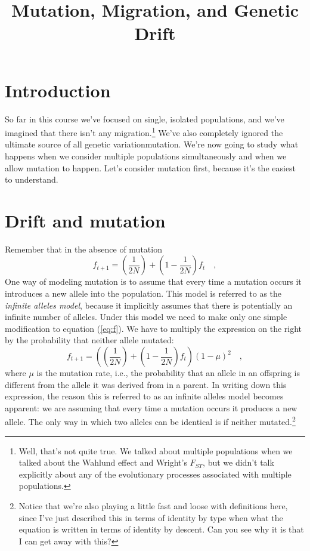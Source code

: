 \documentclass[12pt]{article}
\title{Mutation, Migration, and Genetic Drift}
\begin{document}
\maketitle

\thispagestyle{first}

\section*{Introduction}

So far in this course we've focused on single, isolated populations,
and we've imagined that there isn't any migration.\footnote{Well,
  that's not quite true. We talked about multiple populations when we
  talked about the Wahlund effect and Wright's $F_{ST}$, but we didn't
  talk explicitly about any of the evolutionary processes associated
  with multiple populations.}  We've also completely ignored the
ultimate source of all genetic variation{\dash}mutation. We're now
going to study what happens when we consider multiple populations
simultaneously and when we allow mutation to happen. Let's consider
mutation first, because it's the easiest to understand.

\section*{Drift and mutation}

Remember that in the absence of mutation
\begin{equation}
f_{t+1} = \left(\frac{1}{2N}\right) +
          \left(1 - \frac{1}{2N}\right)f_t \quad \label{eq:f} ,
\end{equation}
One way of modeling mutation is to assume that every time a mutation
occurs it introduces a new allele into the population. This model is
referred to as the {\it infinite alleles model}, because it implicitly
assumes that there is potentially an infinite number of
alleles. Under this model we
need to make only one simple modification to equation (\ref{eq:f}). We
have to multiply the expression on the right by the probability that
neither allele mutated:
\begin{equation}
f_{t+1} = \left(\left(\frac{1}{2N}\right) +
          \left(1 - \frac{1}{2N}\right)f_t\right)(1-\mu)^2 \quad
\label{eq:f-mu} ,
\end{equation}
where $\mu$ is the mutation rate, i.e., the probability that an allele
in an offspring is different from the allele it was derived from in a
parent. In writing down this expression, the reason this is referred
to as an infinite alleles model becomes apparent: we are assuming that
every time a mutation occurs it produces a new allele. The only way in
which two alleles can be identical is if neither
mutated.\footnote{Notice that we're also playing a little fast and
  loose with definitions here, since I've just described this in terms
  of identity by type when what the equation is written in terms of
  identity by descent. Can you see why it is that I can get away with
  this?}
\end{document}
